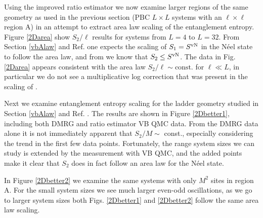 Using the improved ratio estimator we now examine larger regions of the same geometry as used in the previous section (PBC $L \times L$ systems with an $\ell \times\ell$ region A) in an attempt to extract area law scaling of the entanglement entropy.
Figure \ref{2Darea} show $S_2/\ell$ results for systems from $L=4$ to $L=32$.
From Section \ref{vbAlaw} and Ref. \cite{PRL1} one expects the scaling of $S_1 = S^{\text{vN}}$ in the N\'eel state to follow the area law, and from  we know that $S_2 \le S^{\text{vN}}$.
The data in Fig. \ref{2Darea} appears consistent with the area law $S_2/\ell \sim \text{const.}$ for $\ell \ll L$, in particular we do not see a multiplicative log correction that was present in the scaling of \vb \cite{Alet, Chh}. 

Next we examine entanglement entropy scaling for the ladder geometry studied in Section \ref{vbAlaw} and Ref. \cite{PRL1}.
The results are shown in Figure \ref{2Dbetter1}, including both DMRG and ratio estimator VB QMC data.  
From the DMRG data alone it is not immediately apparent that $S_2/M \sim$ const., especially considering the trend in the first few data points. 
Fortunately, the range system sizes we can study is extended by the \swa measurement with VB QMC, and the added points make it clear that $S_2$ does in fact follow an area law for the N\'eel state.

In Figure \ref{2Dbetter2} we examine the same systems with only $M^2$ sites in region A.
For the small system sizes we see much larger even-odd oscillations, as we go to larger system sizes both Figs. \ref{2Dbetter1} and \ref{2Dbetter2} follow the same area law scaling.


